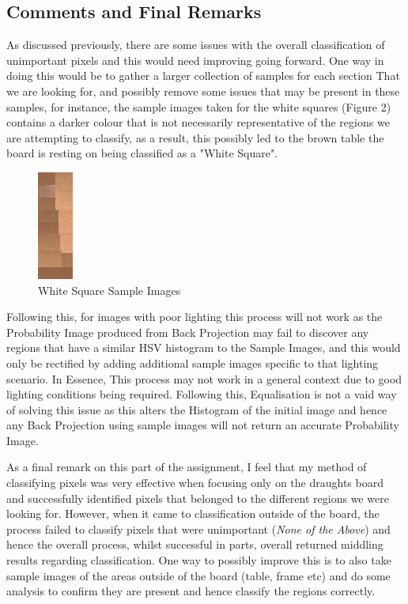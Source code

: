 \documentclass[12pt]{article}
\begin{document}
    \subsection{Comments and Final Remarks}
    \par
    As discussed previously, there are some issues with the overall classification of unimportant pixels and this would need improving going forward. One way in doing this would be to gather a larger collection of samples for each section
    That we are looking for, and possibly remove some issues that may be present in these samples, for instance, the sample images taken for the white squares (Figure 2) contains a darker colour that is not necessarily representative of the
    regions we are attempting to classify, as a result, this possibly led to the brown table the board is resting on being classified as a "White Square".
    \begin{figure}
        \centering
        \includegraphics[scale=1]{DraughtsGame1WhiteSquares.png}
        \caption{White Square Sample Images}
    \end{figure}
    \par
    Following this, for images with poor lighting this process will not work as the Probability Image produced from Back Projection may fail to discover any regions that have a similar HSV histogram to the Sample Images, and this would only be
    rectified by adding additional sample images specific to that lighting scenario. In Essence, This process may not work in a general context due to good lighting conditions being required. Following this, Equalisation is not a vaid way of solving
    this issue as this alters the Histogram of the initial image and hence any Back Projection using sample images will not return an accurate Probability Image.
    \par
    As a final remark on this part of the assignment, I feel that my method of classifying pixels was very effective when focusing only on the draughts board and successfully identified pixels that belonged to the different regions we were looking for.
    However, when it came to classification outside of the board, the process failed to classify pixels that were unimportant (\emph{None of the Above}) and hence the overall process, whilst successful in parts, overall returned middling results regarding classification.
    One way to possibly improve this is to also take sample images of the areas outside of the board (table, frame etc) and do some analysis to confirm they are present and hence classify the regions correctly.
    
\end{document}
